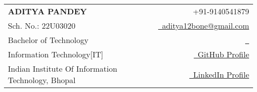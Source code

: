 \documentclass[a4paper,12pt]{article}
\makeatletter
\newcommand{\name}{ADITYA PANDEY} %
\newcommand{\course}{Bachelor of Technology} %
\newcommand{\roll}{22U03020} %
\newcommand{\phone}{9140541879} %
\newcommand{\emaila}{aditya12bone@gmail.com} %
\makeatother
\begin{document}
\selectfont

\parbox{\dimexpr\linewidth-2.8cm\relax}{
\begin{tabularx}{\linewidth}{L r} \\
  \textbf{\Large \name} & {\raisebox{0.0\height}{\footnotesize \faPhone}\ +91-\phone}\\
  {Sch. No.: \roll} & \href{mailto:\emaila}{\raisebox{0.0\height}{\footnotesize \faEnvelope}\ {\emaila}} \\
  \course &  \href{mailto:\emailb}{\raisebox{0.0\height}{\footnotesize }\ {}}\\
  {Information Technology[IT]} &  \href{https://github.com/addy0328p}{\raisebox{0.0\height}{\footnotesize \faGithub}\ {\color{blue}GitHub Profile}} \\
  {Indian Institute Of Information Technology, Bhopal} & \href{https://www.linkedin.com/in/aditya-pandey-5a2b7424a/}{\raisebox{0.0\height}{\footnotesize \faLinkedin}\ {\color{blue}LinkedIn Profile}}
\end{tabularx}
}
\end{document}
